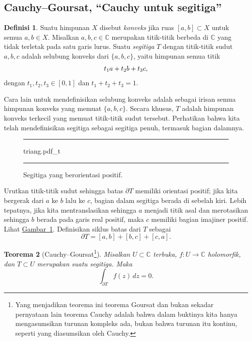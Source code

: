\documentclass[12pt,openany]{book}
\newcommand{\avoidbreak}{\postdisplaypenalty=100}
\newcommand{\C}{{\mathbb{C}}}
\newcommand{\myindex}[1]{#1\index{#1}}
\newcommand{\myquote}[1]{``#1''}
\theoremstyle{plain}
\newtheorem{thm}{Teorema}[section]
\theoremstyle{remark}
\theoremstyle{definition}
\newtheorem{defn}[thm]{Definisi}
\newenvironment{myfig}{%
\begin{figure}[h!t]
\noindent\rule{\textwidth}{0.5pt}\vspace{12pt}\par\centering}%
{\par\noindent\rule{\textwidth}{0.5pt}
\end{figure}}
\theoremstyle{exercise}
\theoremstyle{example}
\newcommand{\figureref}[1]{\hyperref[#1]{Gambar~\ref*{#1}}}
\begin{document}
\subsection{Cauchy--Goursat, \myquote{Cauchy untuk segitiga}}

\begin{defn}
Suatu himpunan $X$ disebut \emph{\myindex{konveks}} jika ruas $[a,b] \subset X$ untuk semua $a,b \in
X$.
Misalkan $a,b,c \in \C$ merupakan titik-titik berbeda di $\C$ yang tidak terletak pada
satu garis lurus.
Suatu \emph{\myindex{segitiga}} $T$
dengan titik-titik sudut $a,b,c$ adalah selubung konveks
dari $\{ a,b,c \}$, yaitu
himpunan semua titik
\begin{equation*}
t_1 a + t_2 b + t_3 c ,
\avoidbreak
\end{equation*}
dengan $t_1,t_2,t_3 \in [0,1]$ dan $t_1+t_2+t_3 = 1$.
\end{defn}

Cara lain untuk mendefinisikan
selubung konveks adalah sebagai irisan semua himpunan konveks yang memuat $\{ a,b,c \}$.
Secara khusus, $T$ adalah himpunan konveks terkecil yang memuat titik-titik sudut tersebut.
Perhatikan bahwa kita telah mendefinisikan segitiga sebagai segitiga penuh, termasuk
bagian dalamnya.

\begin{myfig}
{triang.pdf_t}
\caption{Segitiga yang berorientasi positif.%
\label{fig:triang}}
\end{myfig}
Urutkan titik-titik sudut sehingga batas $\partial T$ memiliki orientasi positif;
jika kita bergerak dari $a$ ke $b$ lalu ke $c$, bagian dalam segitiga 
berada di sebelah kiri.  Lebih tepatnya, jika kita mentranslasikan sehingga $a$ menjadi
titik asal dan merotasikan sehingga $b$ berada pada garis real positif, maka $c$
memiliki bagian imajiner positif.  Lihat \figureref{fig:triang}.  Definisikan siklus batas
dari $T$ sebagai
\begin{equation*}
\partial T = [a,b] + [b,c] + [c,a] .
\end{equation*}

\begin{thm}[Cauchy--Goursat\footnote{%
Yang menjadikan teorema ini teorema Goursat
dan bukan sekadar pernyataan lain teorema Cauchy
adalah bahwa dalam buktinya kita hanya mengasumsikan turunan kompleks ada,
bukan bahwa turunan itu kontinu, seperti yang diasumsikan
oleh Cauchy.}]\label{thm:cauchygoursat}
\pagebreak[2]
Misalkan $U \subset \C$ terbuka, $f \colon U \to \C$
holomorfik,
dan $T \subset U$ merupakan suatu segitiga.  Maka
\begin{equation*}
\int_{\partial T} f(z) \, dz = 0 .
\end{equation*}
\end{thm}
\end{document}
